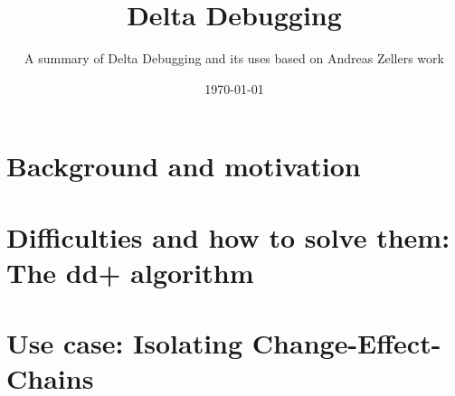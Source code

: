 


\title[Delta Debugging]{Delta Debugging}
\subtitle{A summary of Delta Debugging and its uses based on Andreas Zellers work}
\date{\today}




\titleframe

\section{Background and motivation}


\section{Difficulties and how to solve them: The dd+ algorithm}



\section{Use case: Isolating Change-Effect-Chains}


%

%

